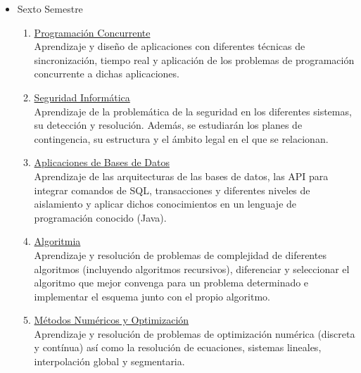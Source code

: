 \begin{itemize}
\item Sexto Semestre
\begin{enumerate}[resume]
\item \underline{Programación Concurrente}\\Aprendizaje y diseño de aplicaciones  con diferentes técnicas de sincronización, tiempo real y aplicación de los problemas de programación concurrente a dichas aplicaciones. 
\item \underline{Seguridad Informática}\\Aprendizaje de la problemática de  la seguridad en los diferentes sistemas, su detección y  resolución. Además, se estudiarán los planes de contingencia, su estructura y el ámbito legal en el que se relacionan. 
\item \underline{Aplicaciones de Bases de Datos}\\Aprendizaje de las arquitecturas de las bases de datos, las API para integrar comandos de SQL, transacciones y diferentes niveles de aislamiento y aplicar dichos conocimientos en  un lenguaje de programación conocido (Java).
\item \underline{Algoritmia}\\Aprendizaje y resolución de problemas de complejidad de diferentes algoritmos (incluyendo algoritmos recursivos), diferenciar y seleccionar el algoritmo que mejor convenga para un problema determinado e implementar el esquema junto con el propio algoritmo. 
\item \underline{Métodos Numéricos y Optimización}\\Aprendizaje y resolución de problemas de optimización numérica (discreta y contínua) así como la resolución de ecuaciones, sistemas lineales, interpolación global y segmentaria. 
\end{enumerate}
\end{itemize}

